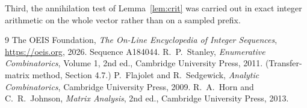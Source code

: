 \documentclass[11pt,a4paper]{article}
\theoremstyle{plain}
\theoremstyle{definition}
\begin{document}
Third, the annihilation test of Lemma~\ref{lem:crit} was carried out in exact integer
arithmetic on the whole vector rather than on a sampled prefix.

\begin{thebibliography}{9}
 The OEIS Foundation, \emph{The On-Line Encyclopedia of Integer
Sequences}, \url{https://oeis.org}, 2026. Sequence A184044.
 R.~P.~Stanley, \emph{Enumerative Combinatorics}, Volume 1, 2nd ed.,
Cambridge University Press, 2011. (Transfer-matrix method, Section 4.7.)
 P.~Flajolet and R.~Sedgewick, \emph{Analytic Combinatorics}, Cambridge
University Press, 2009.
 R.~A.~Horn and C.~R.~Johnson, \emph{Matrix Analysis}, 2nd ed., Cambridge
University Press, 2013.
\end{thebibliography}
\end{document}
